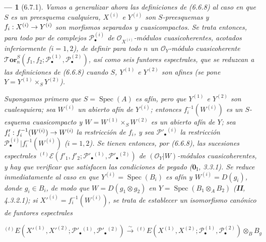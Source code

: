 \documentclass[10pt,oneside,openany]{book}
\theoremstyle{egaenv}\newtheorem*{env}{---}
\theoremstyle{egastatement}
\theoremstyle{egadescription}
\newcommand{\oldpage}[2][]{\marginnote{\normalfont\scriptsize\textbf{#1}\,|\,#2}\ignorespaces}
\renewcommand{\to}{\mathchoice{\longrightarrow}{\rightarrow}{\rightarrow}{\rightarrow}}
\begin{document}
\begin{env}[6.7.1]
\label{III.6.7.1}
Vamos a generalizar ahora las definiciones de (6.6.8) al caso en que $S$ es
un preesquema cualquiera, $X^{(i)}$ e $Y^{(i)}$ son $S$-preesquemas y
$f_i:X^{(i)}\to Y^{(i)}$ son morfismos \emph{separados} y \emph{cuasicompactos}. Se
trata entonces, para todo par de complejos $\mathscr P_\bullet^{(i)}$ de
$\mathscr O_{X^{(i)}}$-módulos cuasicoherentes, acotados inferiormente
($i=1,2$), de definir para todo $n$ un $\mathscr O_Y$-módulo cuasicoherente
$\boldsymbol{\mathscr{T}\!or}_n^S
(f_1,f_2;\mathscr P_\bullet^{(1)},\mathscr P_\bullet^{(2)})$, así como seis
funtores espectrales, que se reduzcan a las definiciones de (6.6.8) cuando
$S$, $Y^{(1)}$ e $Y^{(2)}$ son afines (se pone
$Y=Y^{(1)}\times_S Y^{(2)}$).

Supongamos primero que $S=\operatorname{Spec}(A)$ es \emph{afín}, pero que
$Y^{(1)}$ e $Y^{(2)}$ son cualesquiera; sea $W^{(i)}$ un abierto afín de
$Y^{(i)}$; entonces $f_i^{-1}(W^{(i)})$ es un $S$-esquema cuasicompacto y
$W=W^{(1)}\times_S W^{(2)}$ es un abierto afín de $Y$; sea
$f'_i:f_i^{-1}(W^{(i)})\to W^{(i)}$ la restricción de $f_i$, y sea
$\mathscr P'_\bullet{}^{(i)}$ la restricción
$\mathscr P_\bullet^{(i)}|f_i^{-1}(W^{(i)})$ ($i=1,2$). Se tienen entonces,
por (6.6.8), las sucesiones espectrales
${}^{(t)}\mathscr E
(f'_1,f'_2;\mathscr P'_\bullet{}^{(1)},\mathscr P'_\bullet{}^{(2)})$
de $(\mathscr O_Y|W)$-módulos cuasicoherentes, y hay que verificar que
satisfacen las condiciones de pegado ($\mathbf{0}_{\mathrm I}$, 3.3.1).
Se reduce inmediatamente al caso en que
$Y^{(i)}=\operatorname{Spec}(B_i)$ es afín y $W^{(i)}=D(g_i)$, donde
$g_i\in B_i$, de modo que
$W=D(g_1\otimes g_2)$
\oldpage[III]{158}
en $Y=\operatorname{Spec}(B_1\otimes_A B_2)$ (\textbf{II}, 4.3.2.1); si
$X'^{(i)}=f_i^{-1}(W^{(i)})$, se trata de establecer un isomorfismo canónico
de funtores espectrales

\label{III.6.7.1.1}
\[
  {}^{(t)}E
  (X'^{(1)},X'^{(2)};
   \mathscr P'_\bullet{}^{(1)},\mathscr P'_\bullet{}^{(2)})
  \xrightarrow{\sim}
  {}^{(t)}E
  (X^{(1)},X^{(2)};
   \mathscr P_\bullet^{(1)},\mathscr P_\bullet^{(2)})
  \otimes_B B_g
  \tag{6.7.1.1}\label{III.6.7.1.1.fr}
\]



\end{env}
\end{document}
